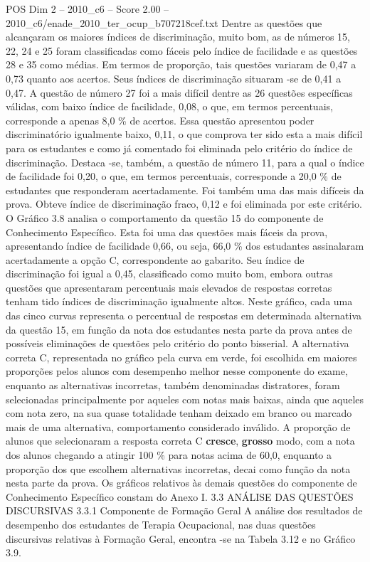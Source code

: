 \begin{textsample}{POS Dim 2 – 2010\_c6 – Score 2.00 – 2010\_c6/enade\_2010\_ter\_ocup\_b707218cef.txt}
Dentre as questões que alcançaram os maiores índices de discriminação, muito bom, as de números 15, 22, 24 e 25 foram classificadas como fáceis pelo índice de facilidade e as questões 28 e 35 como médias.
Em termos de proporção, tais questões variaram de 0,47 a 0,73 quanto aos acertos.
Seus índices de discriminação situaram -se de 0,41 a 0,47.
A questão de número 27 foi a mais difícil dentre as 26 questões específicas válidas, com baixo índice de facilidade, 0,08, o que, em termos percentuais, corresponde a apenas 8,0 \% de acertos.
Essa questão apresentou poder discriminatório igualmente baixo, 0,11, o que comprova ter sido esta a mais difícil para os estudantes e como já comentado foi eliminada pelo critério do índice de discriminação.
Destaca -se, também, a questão de número 11, para a qual o índice de facilidade foi 0,20, o que, em termos percentuais, corresponde a 20,0 \% de estudantes que responderam acertadamente.
Foi também uma das mais difíceis da prova.
Obteve índice de discriminação fraco, 0,12 e foi eliminada por este critério.
O Gráfico 3.8 analisa o comportamento da questão 15 do componente de Conhecimento Específico.
Esta foi uma das questões mais fáceis da prova, apresentando índice de facilidade 0,66, ou seja, 66,0 \% dos estudantes assinalaram acertadamente a opção C, correspondente ao gabarito.
Seu índice de discriminação foi igual a 0,45, classificado como muito bom, embora outras questões que apresentaram percentuais mais elevados de respostas corretas tenham tido índices de discriminação igualmente altos.
Neste gráfico, cada uma das cinco curvas representa o percentual de respostas em determinada alternativa da questão 15, em função da nota dos estudantes nesta parte da prova antes de possíveis eliminações de questões pelo critério do ponto bisserial.
A alternativa correta C, representada no gráfico pela curva em verde, foi escolhida em maiores proporções pelos alunos com desempenho melhor nesse componente do exame, enquanto as alternativas incorretas, também denominadas distratores, foram selecionadas principalmente por aqueles com notas mais baixas, ainda que aqueles com nota zero, na sua quase totalidade tenham deixado em branco ou marcado mais de uma alternativa, comportamento considerado inválido.
A proporção de alunos que selecionaram a resposta correta C \textbf{cresce}, \textbf{grosso} modo, com a nota dos alunos chegando a atingir 100 \% para notas acima de 60,0, enquanto a proporção dos que escolhem alternativas incorretas, decai como função da nota nesta parte da prova.
Os gráficos relativos às demais questões do componente de Conhecimento Específico constam do Anexo I. 3.3 ANÁLISE DAS QUESTÕES DISCURSIVAS 3.3.1 Componente de Formação Geral A análise dos resultados de desempenho dos estudantes de Terapia Ocupacional, nas duas questões discursivas relativas à Formação Geral, encontra -se na Tabela 3.12 e no Gráfico 3.9.

\end{textsample}

